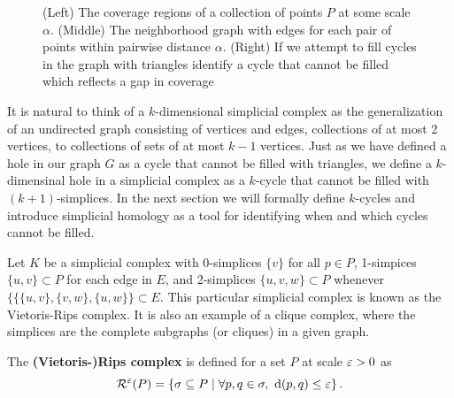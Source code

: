 \begin{figure}[htbp]
     \caption{(Left) The coverage regions of a collection of points $P$ at some scale $\alpha$.
            (Middle) The neighborhood graph with edges for each pair of points within pairwise distance $\alpha$.
            (Right) If we attempt to fill cycles in the graph with triangles identify a cycle that cannot be filled which reflects a gap in coverage}
     \label{fig:holes}
 \end{figure}

It is natural to think of a $k$-dimensional simplicial complex as the generalization of an undirected graph consisting of vertices and edges, collections of at most 2 vertices, to collections of sets of at most $k-1$ vertices.
Just as we have defined a hole in our graph $G$ as a cycle that cannot be filled with triangles, we define a $k$-dimensinal hole in a simplicial complex as a $k$-cycle that cannot be filled with $(k+1)$-simplices.
In the next section we will formally define $k$-cycles and introduce simplicial homology as a tool for identifying when and which cycles cannot be filled.

Let $K$ be a simplicial complex with 0-simplices $\{v\}$ for all $p\in P$, 1-simpices $\{u, v\}\subset P$ for each edge in $E$, and 2-simplices $\{u,v,w\}\subset P$ whenever $\{\{\{u,v\},\{v,w\},\{u,w\}\}\subset E$.
This particular simplicial complex is known as the Vietoris-Rips complex.
It is also an example of a clique complex, where the simplices are the complete subgraphs (or cliques) in a given graph.
\begin{definition}
    The \textbf{(Vietoris-)Rips complex} is defined for a set $P$ at scale $\varepsilon > 0$ as
    \[ \mathcal{R}^\varepsilon(P) = \left\{\sigma \subseteq P\mid \forall p,q\in\sigma,\ \mathrm{d}(p, q)\leq\varepsilon\right\}. \]
\end{definition}


